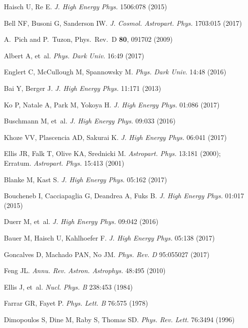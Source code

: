 \documentclass{ar-1col}
\begin{document}
\begin{thebibliography}{175}
Haisch U, Re E. \textit{J. High Energy Phys.} 1506:078 (2015)

Bell NF, Busoni G, Sanderson IW. \textit{J. Cosmol. Astropart. Phys.} 1703:015 (2017)

  A.~Pich and P.~Tuzon, Phys.\ Rev.\ D {\bf 80}, 091702 (2009)

Albert A, et~al. \textit{Phys. Dark Univ.} 16:49 (2017)

Englert C, McCullough M, Spannowsky M. \textit{Phys. Dark Univ.}
14:48 (2016)

Bai Y, Berger J. \textit{J. High Energy Phys.} 11:171 (2013)

Ko P, Natale A, Park M, Yokoya H. \textit{J. High Energy Phys.} 01:086 (2017)

Buschmann M, et~al. \textit{J. High Energy Phys.} 09:033 (2016)

Khoze VV, Plascencia AD, Sakurai K. \textit{J. High Energy Phys.} 06:041 (2017)

Ellis JR, Falk T, Olive KA, Srednicki M. \textit{Astropart. Phys.}
13:181 (2000); Erratum. \textit{Astropart. Phys.} 15:413 (2001)

Blanke M, Kast S. \textit{J. High Energy Phys.} 05:162 (2017)

Boucheneb I, Cacciapaglia G, Deandrea A, Fuks B. \textit{J. High Energy Phys.}
01:017 (2015)

Duerr M, et~al. \textit{J. High Energy Phys.} 09:042 (2016)

Bauer M, Haisch U, Kahlhoefer F. \textit{J. High Energy Phys.} 05:138 (2017)

Goncalves D, Machado PAN, No JM. \textit{Phys. Rev.} \textit{D} 95:055027
(2017)

Feng JL. \textit{Annu. Rev. Astron. Astrophys.} 48:495 (2010)

{Ellis} J, et~al. \textit{Nucl. Phys. B} 238:453 (1984)

Farrar GR, Fayet P. \textit{Phys. Lett. B} 76:575 (1978)

Dimopoulos S, Dine M, Raby S, Thomas SD. \textit{Phys. Rev. Lett.}
76:3494 (1996)


\end{thebibliography}
\end{document}
